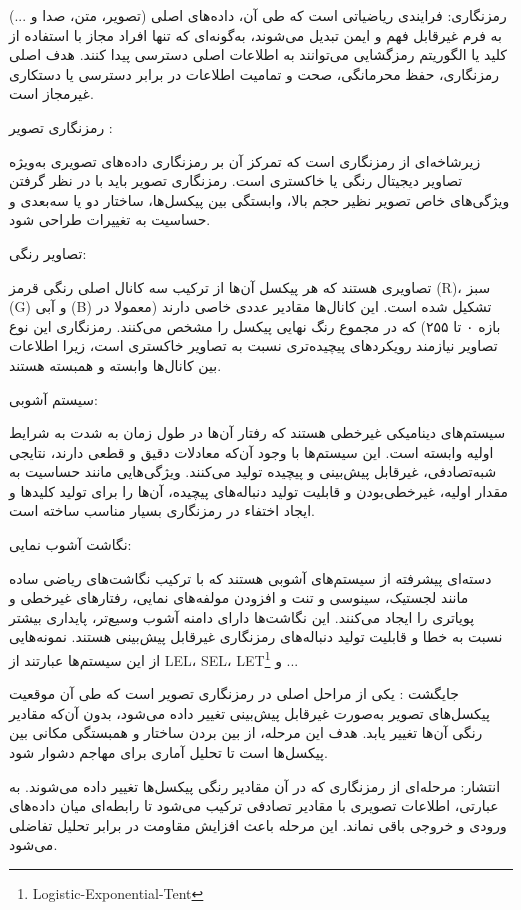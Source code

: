 رمزنگاری:
فرایندی ریاضیاتی است که طی آن، داده‌های اصلی (تصویر، متن، صدا و ...) به فرم غیرقابل فهم و ایمن تبدیل می‌شوند، به‌گونه‌ای که تنها افراد مجاز با استفاده از کلید یا الگوریتم رمزگشایی می‌توانند به اطلاعات اصلی دسترسی پیدا کنند. هدف اصلی رمزنگاری، حفظ محرمانگی، صحت و تمامیت اطلاعات در برابر دسترسی یا دستکاری غیرمجاز است.

رمزنگاری تصویر :

زیرشاخه‌ای از رمزنگاری است که تمرکز آن بر رمزنگاری داده‌های تصویری به‌ویژه تصاویر دیجیتال رنگی یا خاکستری است. رمزنگاری تصویر باید با در نظر گرفتن ویژگی‌های خاص تصویر نظیر حجم بالا، وابستگی بین پیکسل‌ها، ساختار دو یا سه‌بعدی و حساسیت به تغییرات طراحی شود.

تصاویر رنگی:

تصاویری هستند که هر پیکسل آن‌ها از ترکیب سه کانال اصلی رنگی قرمز (R)، سبز (G) و آبی (B) تشکیل شده است. این کانال‌ها مقادیر عددی خاصی دارند (معمولا در بازه ۰ تا ۲۵۵) که در مجموع رنگ نهایی پیکسل را مشخص می‌کنند. رمزنگاری این نوع تصاویر نیازمند رویکردهای پیچیده‌تری نسبت به تصاویر خاکستری است، زیرا اطلاعات بین کانال‌ها وابسته و همبسته هستند.

سیستم آشوبی:

سیستم‌های دینامیکی غیرخطی هستند که رفتار آن‌ها در طول زمان به شدت به شرایط اولیه وابسته است. این سیستم‌ها با وجود آن‌که معادلات دقیق و قطعی دارند، نتایجی شبه‌تصادفی، غیرقابل پیش‌بینی و پیچیده تولید می‌کنند. ویژگی‌هایی مانند حساسیت به مقدار اولیه، غیرخطی‌بودن و قابلیت تولید دنباله‌های پیچیده، آن‌ها را برای تولید کلیدها و ایجاد اختفاء در رمزنگاری بسیار مناسب ساخته است.

نگاشت آشوب نمایی:

دسته‌ای پیشرفته از سیستم‌های آشوبی هستند که با ترکیب نگاشت‌های ریاضی ساده مانند لجستیک، سینوسی و تنت و افزودن مولفه‌های نمایی، رفتارهای غیرخطی و پویاتری را ایجاد می‌کنند. این نگاشت‌ها دارای دامنه آشوب وسیع‌تر، پایداری بیشتر نسبت به خطا و قابلیت تولید دنباله‌های رمزنگاری غیرقابل پیش‌بینی هستند. نمونه‌هایی از این سیستم‌ها عبارتند از LEL، SEL، LET\footnote{Logistic-Exponential-Tent}  و ...

جایگشت :
یکی از مراحل اصلی در رمزنگاری تصویر است که طی آن موقعیت پیکسل‌های تصویر به‌صورت غیرقابل پیش‌بینی تغییر داده می‌شود، بدون آن‌که مقادیر رنگی آن‌ها تغییر یابد. هدف این مرحله، از بین بردن ساختار و همبستگی مکانی بین پیکسل‌ها است تا تحلیل آماری برای مهاجم دشوار شود.

انتشار:
مرحله‌ای از رمزنگاری که در آن مقادیر رنگی پیکسل‌ها تغییر داده می‌شوند. به عبارتی، اطلاعات تصویری با مقادیر تصادفی ترکیب می‌شود تا رابطه‌ای میان داده‌های ورودی و خروجی باقی نماند. این مرحله باعث افزایش مقاومت در برابر تحلیل تفاضلی می‌شود.

